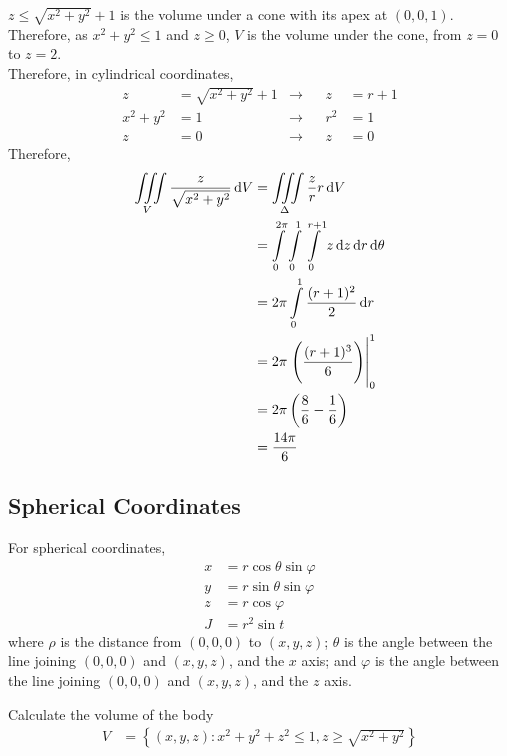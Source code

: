 \documentclass[fleqn, a4paper, 12pt, twoside]{article}
\theoremstyle{definition}
\theoremstyle{theorem}
\begin{document}
\begin{solution}
	$z \le \sqrt{x^2 + y^2} + 1$ is the volume under a cone with its apex at $(0,0,1)$.\\
	Therefore, as $x^2 + y^2 \le 1$ and $z \ge 0$, $V$ is the volume under the cone, from $z = 0$ to $z = 2$.\\
	Therefore, in cylindrical coordinates,
	\begin{align*}
		z         & = \sqrt{x^2 + y^2} + 1 & \to &  & z   & = r + 1 \\
		x^2 + y^2 & = 1                    & \to &  & r^2 & = 1     \\
		z         & = 0                    & \to &  & z   & = 0
	\end{align*}
	Therefore,
	\begin{align*}
		\iiint\limits_{V} \frac{z}{\sqrt{x^2 + y^2}} \dif V &= \iiint\limits_{\Delta} \frac{z}{r} r \dif V\\
		&= \int\limits_{0}^{2 \pi} \int\limits_{0}^{1} \int\limits_{0}^{r + 1} z \dif z \dif r \dif \theta\\
		&= 2 \pi \int\limits_{0}^{1} \frac{(r + 1)^2}{2} \dif r\\
		&= 2 \pi \left. \left( \frac{(r + 1)^3}{6} \right) \right|_{0}^{1}\\
		&= 2 \pi \left( \frac{8}{6} - \frac{1}{6} \right)\\
		&= \frac{14 \pi}{6}
	\end{align*}
\end{solution}

\subsection{Spherical Coordinates}

For spherical coordinates,
\begin{align*}
	x & = r \cos \theta \sin \varphi \\
	y & = r \sin \theta \sin \varphi \\
	z & = r \cos \varphi             \\
	J & = r^2 \sin t
\end{align*}
where $\rho$ is the distance from $(0,0,0)$ to $(x,y,z)$; $\theta$ is the angle between the line joining $(0,0,0)$ and $(x,y,z)$, and the $x$ axis; and $\varphi$ is the angle between the line joining $(0,0,0)$ and $(x,y,z)$, and the $z$ axis.

\begin{question}
	Calculate the volume of the body
	\begin{align*}
		V & = \left\{ (x,y,z) : x^2 + y^2 + z^2 \le 1 , z \ge \sqrt{x^2 + y^2} \right\}
	\end{align*}
\end{question}
\end{document}
